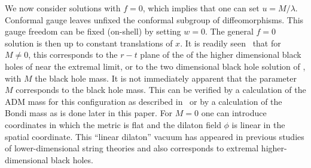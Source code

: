 We now consider solutions with $f=0$, which implies that one can set
$u=M/\lambda$. Conformal
gauge leaves unfixed the conformal subgroup of diffeomorphisms.  This
gauge freedom can be fixed (on-shell) by setting $w=0$.  The general $f=0$
solution
is then
%
\eqn{}
%
up to constant translations of $x$. It is readily
seen \GiSt\ that for $M\not=0$, this corresponds to the $r-t$ plane of
the of the
higher dimensional black holes of  near the extremal
limit, or to the two dimensional
black hole solution of \Witt, with $M$ the black hole mass.
It is not immediately apparent that the parameter $M$ corresponds to the
black hole mass.  This can be verified by a calculation of the ADM
mass for this configuration as described in \Witt\ or by a
calculation of the Bondi mass as is done later in this paper.
For $M=0$ one can introduce coordinates in which the metric is flat and
the dilaton field $\phi$ is linear in the spatial coordinate.
This ``linear dilaton'' vacuum has appeared in previous studies
of lower-dimensional string theories and also corresponds to extremal
higher-dimensional black holes.

